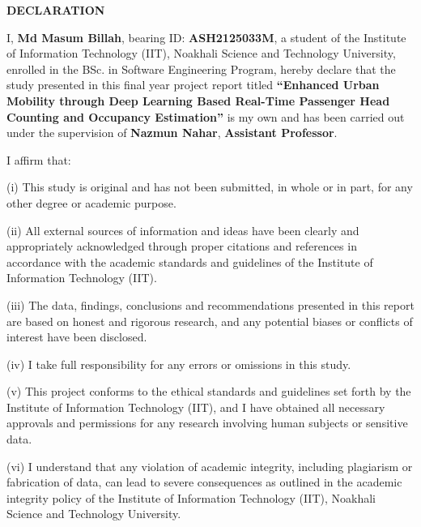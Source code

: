
\begin{center}
	{\Large\bfseries DECLARATION}
\end{center}

I, \textbf{Md Masum Billah}, bearing ID: \textbf{ASH2125033M}, a student of the Institute of Information Technology (IIT), Noakhali Science and Technology University, enrolled in the BSc. in Software Engineering Program, hereby declare that the study presented in this final year project report titled \textbf{``Enhanced Urban Mobility through Deep Learning Based Real-Time Passenger Head Counting and Occupancy Estimation''} is my own and has been carried out under the supervision of \textbf{Nazmun Nahar}, \textbf{Assistant Professor}.
	
\vspace{0.2cm}
	
I affirm that:
	
\noindent
\hangindent=0.8cm
(i) This study is original and has not been submitted, in whole or in part, for any other degree or academic purpose.

\noindent
\hangindent=0.8cm
(ii) All external sources of information and ideas have been clearly and appropriately acknowledged through proper citations and references in accordance with the academic standards and guidelines of the Institute of Information Technology (IIT).
		
\noindent
\hangindent=0.8cm
(iii) The data, findings, conclusions and recommendations presented in this report are based on honest and rigorous research, and any potential biases or conflicts of interest have been disclosed.
		
\noindent
\hangindent=0.8cm
(iv) I take full responsibility for any errors or omissions in this study.
		
\noindent
\hangindent=0.8cm
(v) This project conforms to the ethical standards and guidelines set forth by the Institute of Information Technology (IIT), and I have obtained all necessary approvals and permissions for any research involving human subjects or sensitive data.
		
\noindent
\hangindent=0.8cm
(vi) I understand that any violation of academic integrity, including plagiarism or fabrication of data, can lead to severe consequences as outlined in the academic integrity policy of the Institute of Information Technology (IIT), Noakhali Science and Technology University.
	
